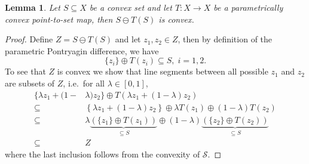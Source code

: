 \documentclass[letterpaper, 10pt, conference]{ieeeconf/ieeeconf} %
\newtheorem{thm}{Lemma}[section]
\begin{document}
    \begin{thm}\label{thm:convexity:of:pontryagin:difference}
      Let $S\subseteq X$ be a convex set and let $T:X\rightarrow X$ be a parametrically convex point-to-set
      map, then $S\ominus T(S)$ is convex. 
    \end{thm}
    \begin{proof}
      Define $ Z =  S\ominus T( S)$ and let $z_1,z_2\in Z$, then
      by definition of the parametric Pontryagin difference, we have
      \begin{equation}
        \{z_i\} \oplus T(z_i) \subseteq S,\; i=1,2.
      \end{equation}
      To see that $ Z$ is convex we show that line segments between
      all possible $z_1$ and $z_2$ are subsets of $ Z$, i.e.~for all $\lambda \in [0,1]$,
      \[\begin{aligned}
        \{ \lambda z_1 + (1-&\lambda)z_2
        \}\oplus T\left( \lambda z_1 + (1-\lambda)z_2\right)\\
        \subseteq&\left\{ \lambda z_1 + (1-\lambda)z_2
        \right\}\oplus \lambda T(z_1) \oplus (1-\lambda)
         T(z_2)\\
        \subseteq &\lambda\underbrace{(\{z_1\}\oplus T(z_1))}_{\subseteq S}\oplus
        (1-\lambda)\underbrace{(\{z_2\}\oplus T(z_2))}_{\subseteq S}\\
        \subseteq& Z
        \end{aligned}\]
      where the last inclusion follows from the convexity of $\mathcal S$.
    \end{proof}
\end{document}
